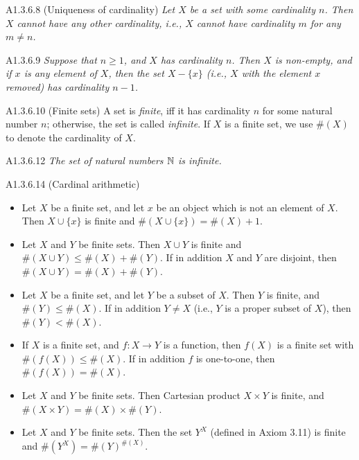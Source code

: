 \begin{proposition}{A1.3.6.8}
    (Uniqueness of cardinality) \emph{Let $X$ be a set with some cardinality $n$. Then $X$ cannot have any other
    cardinality, i.e., $X$ cannot have cardinality $m$ for any $m\neq n$.}
\end{proposition}

\begin{lemma}{A1.3.6.9}
    \emph{Suppose that $n\geq 1$, and $X$ has cardinality $n$. Then $X$ is non-empty, and if $x$ is any element of $X$,
    then the set $X - \{x \}$ (i.e., $X$ with the element $x$ removed) has cardinality $n-1$.}
\end{lemma}

\begin{definition}{A1.3.6.10}
    (Finite sets) A set is \emph{finite}, iff it has cardinality $n$ for some natural number $n$; otherwise, the set is
    called \emph{infinite}. If $X$ is a finite set, we use $\#(X)$ to denote the cardinality of $X$.
\end{definition}

\begin{theorem}{A1.3.6.12}
    \emph{The set of natural numbers $\mathbb{N}$ is infinite.}
\end{theorem}

\begin{proposition}{A1.3.6.14}
    (Cardinal arithmetic)
    \begin{itemize}
        \item Let $X$ be a finite set, and let $x$ be an object which is not an element of $X$. Then $X\cup \{x\}$ is
        finite and $\#(X\cup \{x\}) = \#(X) + 1$.
        \item Let $X$ and $Y$ be finite sets. Then $X\cup Y$ is finite and $\#(X\cup Y) \leq \#(X) + \#(Y)$. If in
        addition $X$ and $Y$ are disjoint, then $\#(X\cup Y) = \#(X) + \#(Y)$.
        \item Let $X$ be a finite set, and let $Y$ be a subset of $X$. Then $Y$ is finite, and $\#(Y)\leq \#(X)$. If
        in addition $Y\neq X$ (i.e., $Y$ is a proper subset of $X$), then $\#(Y) < \#(X)$.
        \item If $X$ is a finite set, and $f: X\rightarrow Y$ is a function, then $f(X)$ is a finite set with
        $\#(f(X))\leq \#(X)$. If in addition $f$ is one-to-one, then $\#(f(X)) = \#(X)$.
        \item Let $X$ and $Y$ be finite sets. Then Cartesian product $X\times Y$ is finite, and
        $\#(X\times Y) = \#(X)\times \#(Y)$.
        \item Let $X$ and $Y$ be finite sets. Then the set $Y^X$ (defined in Axiom 3.11) is finite and
        $\#(Y^X) = \#(Y)^{\#(X)}$.
    \end{itemize}
\end{proposition}

